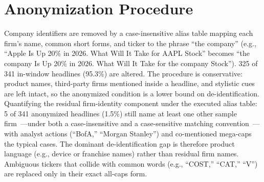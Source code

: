 \section{Anonymization Procedure}\label{app:anon}

Company identifiers are removed by a case-insensitive alias table mapping each firm's name, common short forms, and ticker to the phrase ``the company'' (e.g., ``Apple Is Up 20\% in 2026. What Will It Take for AAPL Stock'' becomes ``the company Is Up 20\% in 2026. What Will It Take for the company Stock''). 325 of 341 in-window headlines (95.3\%) are altered. The procedure is conservative: product names, third-party firms mentioned inside a headline, and stylistic cues are left intact, so the anonymized condition is a lower bound on de-identification. Quantifying the residual firm-identity component under the executed alias table: 5 of 341 anonymized headlines (1.5\%) still name at least one other sample firm~---under both a case-insensitive and a case-sensitive matching convention~---with analyst actions (``BofA,'' ``Morgan Stanley'') and co-mentioned mega-caps the typical cases. The dominant de-identification gap is therefore product language (e.g., device or franchise names) rather than residual firm names. Ambiguous tickers that collide with common words (e.g., ``COST,'' ``CAT,'' ``V'') are replaced only in their exact all-caps form.

